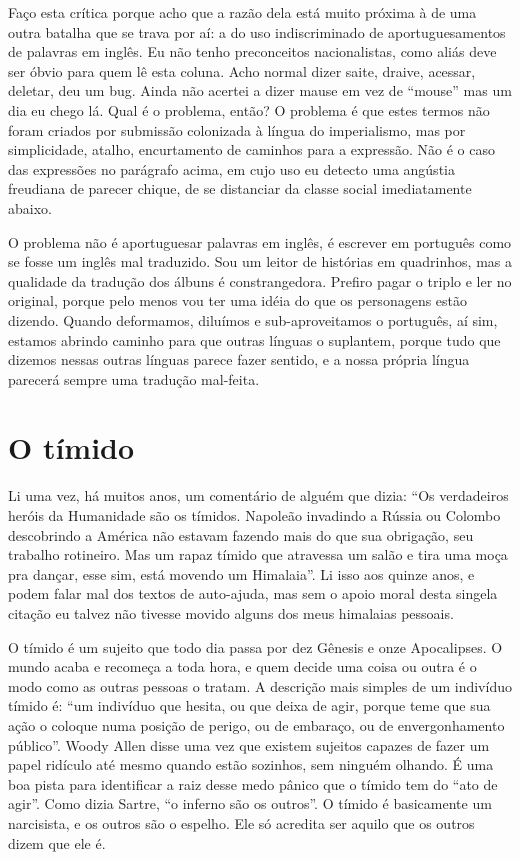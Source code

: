 Faço esta crítica porque acho que a razão dela está muito próxima à de
uma outra batalha que se trava por aí: a do uso indiscriminado de
aportuguesamentos de palavras em inglês. Eu não tenho preconceitos
nacionalistas, como aliás deve ser óbvio para quem lê esta coluna. 
Acho normal dizer saite, draive, acessar, deletar, deu um bug. Ainda
não acertei a dizer mause em vez de “mouse” mas um dia eu chego lá.
Qual é o problema, então? O problema é que estes termos não foram
criados por submissão colonizada à língua do imperialismo, mas por
simplicidade, atalho, encurtamento de caminhos para a expressão. Não
é o caso das expressões no parágrafo acima, em cujo uso eu detecto
uma angústia freudiana de parecer chique, de se distanciar da classe
social imediatamente abaixo.

O problema não é aportuguesar palavras em inglês, é escrever em
português como se fosse um inglês mal traduzido. Sou um leitor de
histórias em quadrinhos, mas a qualidade da tradução dos álbuns é
constrangedora. Prefiro pagar o triplo e ler no original, porque pelo
menos vou ter uma idéia do que os personagens estão dizendo.  Quando
deformamos, diluímos e sub-aproveitamos o português, aí sim, estamos
abrindo caminho para que outras línguas o suplantem, porque tudo que
dizemos nessas outras línguas parece fazer sentido, e a nossa própria
língua parecerá sempre uma tradução mal-feita.

\chapter{O tímido}

Li uma vez, há muitos anos, um comentário de alguém que dizia: “Os
verdadeiros heróis da Humanidade são os tímidos. Napoleão invadindo a
Rússia ou Colombo descobrindo a América não estavam fazendo mais do
que sua obrigação, seu trabalho rotineiro. Mas um rapaz tímido que
atravessa um salão e tira uma moça pra dançar, esse sim, está movendo
um Himalaia”. Li isso aos quinze anos, e podem falar mal dos textos
de auto-ajuda, mas sem o apoio moral desta singela citação eu talvez
não tivesse movido alguns dos meus himalaias pessoais.

O tímido é um sujeito que todo dia passa por dez Gênesis e onze
Apocalipses. O mundo acaba e recomeça a toda hora, e quem decide uma
coisa ou outra é o modo como as outras pessoas o tratam. A descrição
mais simples de um indivíduo tímido é: “um indivíduo que hesita, ou
que deixa de agir, porque teme que sua ação o coloque numa posição de
perigo, ou de embaraço, ou de envergonhamento público”. Woody Allen
disse uma vez que existem sujeitos capazes de fazer um papel ridículo
até mesmo quando estão sozinhos, sem ninguém olhando. É uma boa pista
para identificar a raiz desse medo pânico que o tímido tem do “ato de
agir”. Como dizia Sartre, “o inferno são os outros”. O tímido é
basicamente um narcisista, e os outros são o espelho. Ele só acredita
ser aquilo que os outros dizem que ele é.

